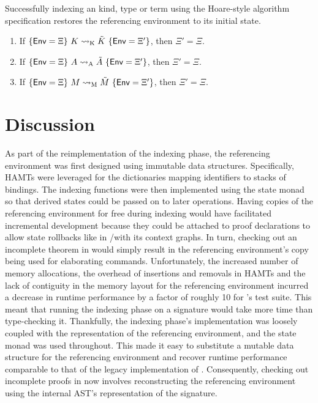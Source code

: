 \begin{corollary}
Successfully indexing an \LF kind, type or term using the Hoare-style algorithm specification restores the referencing environment to its initial state.
\begin{enumerate}
\item If $\{\mathsf{Env} = \Xi\}\ K \rightsquigarrow_{{\normalfont\text{K}}} \tilde K\ \{\mathsf{Env} = \Xi'\}$, then $\Xi' = \Xi$.
\item If $\{\mathsf{Env} = \Xi\}\ A \rightsquigarrow_{{\normalfont\text{A}}} \tilde A\ \{\mathsf{Env} = \Xi'\}$, then $\Xi' = \Xi$.
\item If $\{\mathsf{Env} = \Xi\}\ M \rightsquigarrow_{{\normalfont\text{M}}} \tilde M\ \{\mathsf{Env} = \Xi'\}$, then $\Xi' = \Xi$.
\end{enumerate}
\end{corollary}

\section{Discussion}

As part of the reimplementation of the indexing phase, the referencing environment was first designed using immutable data structures.
Specifically, \acp{HAMT} were leveraged for the dictionaries mapping identifiers to stacks of bindings.
The indexing functions were then implemented using the state monad so that derived states could be passed on to later operations.
Having copies of the referencing environment for free during indexing would have facilitated incremental development because they could be attached to proof declarations to allow state rollbacks like in \Isabelle/\Isar with its context graphs.
In turn, checking out an incomplete theorem in \Harpoon would simply result in the referencing environment's copy being used for elaborating commands.
Unfortunately, the increased number of memory allocations, the overhead of insertions and removals in \acp{HAMT} and the lack of contiguity in the memory layout for the referencing environment incurred a decrease in runtime performance by a factor of roughly 10 for \Beluga's test suite.
This meant that running the indexing phase on a signature would take more time than type-checking it.
Thankfully, the indexing phase's implementation was loosely coupled with the representation of the referencing environment, and the state monad was used throughout.
This made it easy to substitute a mutable data structure for the referencing environment and recover runtime performance comparable to that of the legacy implementation of \Beluga.
Consequently, checking out incomplete proofs in \Harpoon now involves reconstructing the referencing environment using the internal \ac{AST}'s representation of the signature.

